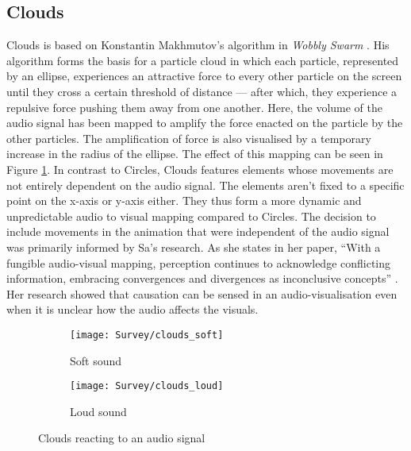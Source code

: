 \documentclass[../initial_thesis.tex]{subfiles}
\begin{document}
\subsection{Clouds}
Clouds is based on Konstantin Makhmutov's algorithm in \textit{Wobbly Swarm} \cite{Makhmutov}. His algorithm forms the basis for a particle cloud in which each particle, represented by an ellipse, experiences an attractive force to every other particle on the screen until they cross a certain threshold of distance --- after which, they experience a repulsive force pushing them away from one another. Here, the volume of the audio signal has been mapped to amplify the force enacted on the particle by the other particles. The amplification of force is also visualised by a temporary increase in the radius of the ellipse. The effect of this mapping can be seen in Figure \ref{fig:clouds1}. In contrast to Circles, Clouds features elements whose movements are not entirely dependent on the audio signal. The elements aren't fixed to a specific point on the x-axis or y-axis either. They thus form a more dynamic and unpredictable audio to visual mapping compared to Circles. The decision to include movements in the animation that were independent of the audio signal was primarily informed by Sa's research. As she states in her paper, ``With a fungible audio-visual mapping, perception continues to acknowledge conflicting information, embracing convergences and divergences as inconclusive concepts'' \cite{Sa2014}. Her research showed that causation can be sensed in an audio-visualisation even when it is unclear how the audio affects the visuals. 

\begin{figure}
  \begin{subfigure}{0.5\textwidth}
    \texttt{[image: Survey/clouds\_soft]}
    \caption{Soft sound}
  \end{subfigure} 
  \begin{subfigure}{0.5\textwidth}
    \texttt{[image: Survey/clouds\_loud]}
    \caption{Loud sound}
  \end{subfigure}
  \caption{Clouds reacting to an audio signal}
  \label{fig:clouds1}
\end{figure}
\end{document}
